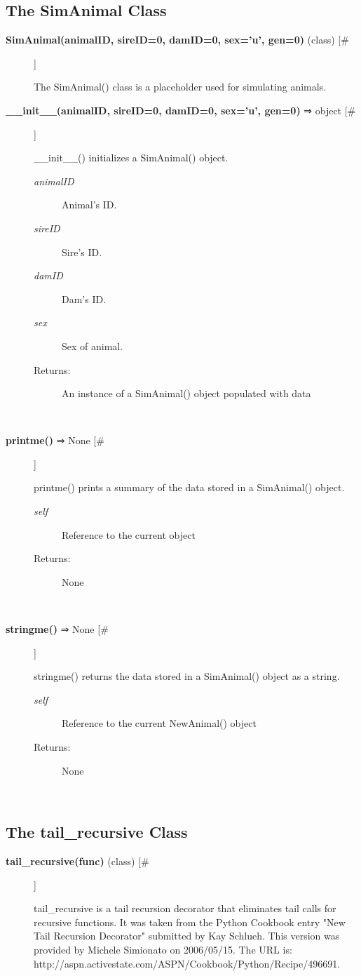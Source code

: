 \documentclass{article}
\begin{document}
\subsection*{The SimAnimal Class}
\begin{description}
\item[\textbf{SimAnimal(animalID, sireID=0, damID=0, sex='u', gen=0)} (class) [\#]
]
\par The SimAnimal() class is a placeholder used for simulating animals.

\item[\textbf{\_\_init\_\_(animalID, sireID=0, damID=0, sex='u', gen=0)} ⇒ object [\#]
]
\par \_\_init\_\_() initializes a SimAnimal() object.
\begin{description}
\item[\textit{animalID}
]
Animal's ID.
\item[\textit{sireID}
]
Sire's ID.
\item[\textit{damID}
]
Dam's ID.
\item[\textit{sex}
]
Sex of animal.
\item[Returns:
]
An instance of a SimAnimal() object populated with data
\end{description}\\

\item[\textbf{printme()} ⇒ None [\#]
]
\par printme() prints a summary of the data stored in a SimAnimal() object.
\begin{description}
\item[\textit{self}
]
Reference to the current object
\item[Returns:
]
None
\end{description}\\

\item[\textbf{stringme()} ⇒ None [\#]
]
\par stringme() returns the data stored in a SimAnimal() object as a string.
\begin{description}
\item[\textit{self}
]
Reference to the current NewAnimal() object
\item[Returns:
]
None
\end{description}\\

\end{description}
\subsection*{The tail\_recursive Class}
\begin{description}
\item[\textbf{tail\_recursive(func)} (class) [\#]
]
\par tail\_recursive is a tail recursion decorator that eliminates tail calls
for recursive functions. It was taken from the Python Cookbook entry
"New Tail Recursion Decorator" submitted by Kay Schlueh. This version was
provided by Michele Simionato on 2006/05/15. The URL is:
http://aspn.activestate.com/ASPN/Cookbook/Python/Recipe/496691.

\end{description}
\end{document}
